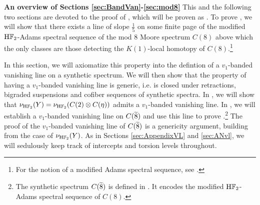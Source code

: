 {\bf An overview of Sections \ref{sec:BandVan}-\ref{sec:mod8}}
This and the following two sections are devoted to the proof of , which will be proven as . To prove , we will show that there exists a line of slope $\frac{1}{5}$ on some finite page of the modified $\mathrm{H}\mathbb{F}_2$-Adams spectral sequence of the mod $8$ Moore spectrum $C(8)$ above which the only classes are those detecting the $K(1)$-local homotopy of $C(8)$.\footnote{For the notion of a modified Adams spectral sequence, see \cite[Section 3]{BHHM}.}

In this section, we will axiomatize this property into the defintion of a $v_1$-banded vanishing line on a synthetic spectrum. We will then show that the property of having a $v_1$-banded vanishing line is generic, i.e. is closed under retractions, bigraded suspensions and cofiber sequences of synthetic spectra. In , we will show that $\nu_{\mathrm{H}\mathbb{F}_2} (Y) = \nu_{\mathrm{H}\mathbb{F}_2} (C(2) \otimes C(\eta))$ admits a $v_1$-banded vanishing line.
In , we will establish a $v_1$-banded vanishing line on $C(\wt{8})$ and use this line to prove .\footnote{The synthetic spectrum $C(\wt{8})$ is defined in . It encodes the modified $\mathrm{H}\mathbb{F}_2$-Adams spectral sequence of $C(8)$.}  The proof of the $v_1$-banded vanishing line of $C(\wt{8})$ is a genericity argument, building from the case of $\nu_{\mathrm{H}\mathbb{F}_2} (Y)$. As in Sections \ref{sec:AppendixVL} and \ref{sec:ANvl}, we will sedulously keep track of intercepts and torsion levels throughout.
%
%

